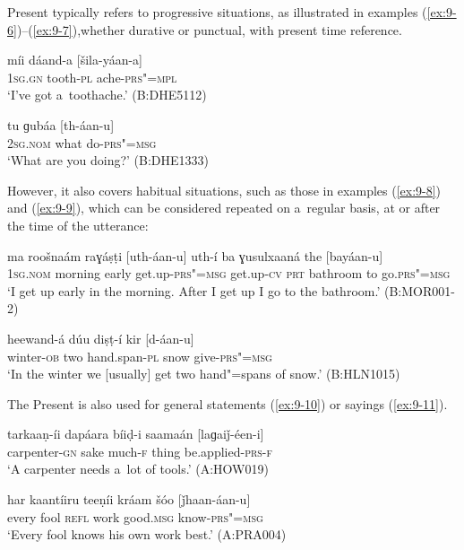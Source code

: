 Present typically refers to progressive situations, as illustrated in examples (\ref{ex:9-6})--(\ref{ex:9-7}),whether durative or punctual, with present time reference.

\begin{exe}
\ex
\label{ex:9-6}
\gll míi dáand-a [šila-yáan-a] \\
\textsc{1sg.gn} tooth-\textsc{pl} ache-\textsc{prs"=mpl} \\
\glt `I've got a~toothache.' (B:DHE5112)

\ex
\label{ex:9-7}
\gll tu ɡubáa [th-áan-u] \\
\textsc{2sg.nom} what do-\textsc{prs"=msg} \\
\glt `What are you doing?' (B:DHE1333)
\end{exe}

However, it also covers habitual situations, such as those in examples (\ref{ex:9-8}) and (\ref{ex:9-9}), which can be considered repeated on a~regular basis, at or after the time of the utterance: 

\begin{exe}
\ex
\label{ex:9-8}
\gll ma roošnaám raɣáṣṭi [uth-áan-u] uth-í ba ɣusulxaaná the [bayáan-u] \\
\textsc{1sg.nom} morning early get.up-\textsc{prs"=msg} get.up-\textsc{cv}  \textsc{prt} bathroom to go.\textsc{prs"=msg} \\
\glt `I get up early in the morning. After I get up I go to the bathroom.' (B:MOR001-2)

\ex
\label{ex:9-9}
\gll heewand-á dúu diṣṭ-í kir [d-áan-u] \\
winter-\textsc{ob} two hand.span-\textsc{pl} snow give-\textsc{prs"=msg} \\
\glt `In the winter we [usually] get two hand"=spans of snow.' (B:HLN1015)
\end{exe}

The Present is also used for general statements (\ref{ex:9-10}) or sayings (\ref{ex:9-11}).

\begin{exe}
\ex
\label{ex:9-10}
\gll tarkaaṇ-íi dapáara bíiḍ-i saamaán [laɡaiǰ-éen-i]  \\
carpenter-\textsc{gn} sake much-\textsc{f} thing be.applied-\textsc{prs-f} \\
\glt `A carpenter needs a~lot of tools.' (A:HOW019)

\ex
\label{ex:9-11}
\gll har kaantíiru teeṇíi kráam šóo [ǰhaan-áan-u] \\
every fool \textsc{refl} work good.\textsc{msg} know-\textsc{prs"=msg} \\
\glt `Every fool knows his own work best.' (A:PRA004)
\end{exe}

